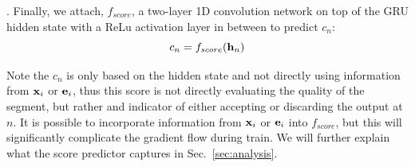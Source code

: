 \documentclass[10pt,journal,compsoc]{IEEEtran}
\begin{document}




. Finally, we attach, $f_{score}$, a two-layer 1D convolution network on top of the GRU hidden state with a ReLu activation layer in between to predict $c_n$:
\begin{equation}
	c_{n} = f_{score}({\bf h}_n)
\end{equation}

Note the $c_n$ is only based on the hidden state and not directly using information from ${\bf x}_i$ or ${\bf e}_i$, thus this score is not directly evaluating the quality of the segment, but rather and indicator of either accepting or discarding the output at $n$. It is possible to incorporate information from ${\bf x}_i$ or ${\bf e}_i$ into $f_{score}$, but this will significantly complicate the gradient flow during train. We will further explain what the score predictor captures in Sec.~\ref{sec:analysis}.
\end{document}
